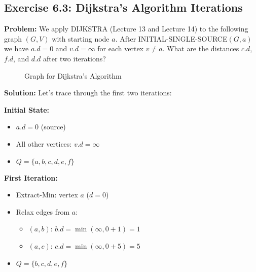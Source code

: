\subsection{Exercise 6.3: Dijkstra's Algorithm Iterations}
\textbf{Problem:} We apply DIJKSTRA (Lecture 13 and Lecture 14) to the following graph $(G,V)$ with starting node $a$. After INITIAL-SINGLE-SOURCE$(G,a)$ we have $a.d = 0$ and $v.d = \infty$ for each vertex $v \neq a$. What are the distances $c.d$, $f.d$, and $d.d$ after two iterations?

\begin{figure}[H]
\centering
{}
\caption*{Graph for Dijkstra's Algorithm}
\end{figure}

\textbf{Solution:} Let's trace through the first two iterations:

\textbf{Initial State:}
\begin{itemize}[noitemsep]
    \item $a.d = 0$ (source)
    \item All other vertices: $v.d = \infty$
    \item $Q = \{a,b,c,d,e,f\}$
\end{itemize}

\textbf{First Iteration:}
\begin{itemize}[noitemsep]
    \item Extract-Min: vertex $a$ ($d = 0$)
    \item Relax edges from $a$:
        \begin{itemize}[noitemsep]
            \item $(a,b)$: $b.d = \min(\infty, 0 + 1) = 1$
            \item $(a,c)$: $c.d = \min(\infty, 0 + 5) = 5$
        \end{itemize}
    \item $Q = \{b,c,d,e,f\}$
\end{itemize}

